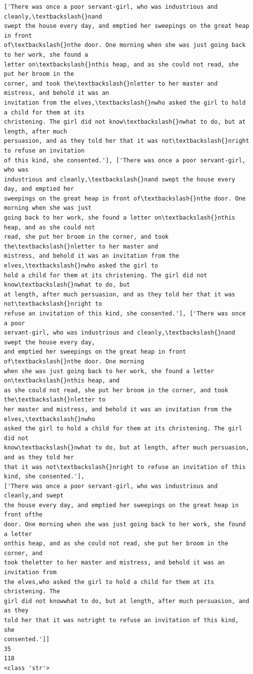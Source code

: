 \documentclass[11pt]{article}
\begin{document}
\begin{Verbatim}[commandchars=\\\{\}]
['There was once a poor servant-girl, who was industrious and cleanly,\textbackslash{}nand
swept the house every day, and emptied her sweepings on the great heap in front
of\textbackslash{}nthe door. One morning when she was just going back to her work, she found a
letter on\textbackslash{}nthis heap, and as she could not read, she put her broom in the
corner, and took the\textbackslash{}nletter to her master and mistress, and behold it was an
invitation from the elves,\textbackslash{}nwho asked the girl to hold a child for them at its
christening. The girl did not know\textbackslash{}nwhat to do, but at length, after much
persuasion, and as they told her that it was not\textbackslash{}nright to refuse an invitation
of this kind, she consented.'], ['There was once a poor servant-girl, who was
industrious and cleanly,\textbackslash{}nand swept the house every day, and emptied her
sweepings on the great heap in front of\textbackslash{}nthe door. One morning when she was just
going back to her work, she found a letter on\textbackslash{}nthis heap, and as she could not
read, she put her broom in the corner, and took the\textbackslash{}nletter to her master and
mistress, and behold it was an invitation from the elves,\textbackslash{}nwho asked the girl to
hold a child for them at its christening. The girl did not know\textbackslash{}nwhat to do, but
at length, after much persuasion, and as they told her that it was not\textbackslash{}nright to
refuse an invitation of this kind, she consented.'], ['There was once a poor
servant-girl, who was industrious and cleanly,\textbackslash{}nand swept the house every day,
and emptied her sweepings on the great heap in front of\textbackslash{}nthe door. One morning
when she was just going back to her work, she found a letter on\textbackslash{}nthis heap, and
as she could not read, she put her broom in the corner, and took the\textbackslash{}nletter to
her master and mistress, and behold it was an invitation from the elves,\textbackslash{}nwho
asked the girl to hold a child for them at its christening. The girl did not
know\textbackslash{}nwhat to do, but at length, after much persuasion, and as they told her
that it was not\textbackslash{}nright to refuse an invitation of this kind, she consented.'],
['There was once a poor servant-girl, who was industrious and cleanly,and swept
the house every day, and emptied her sweepings on the great heap in front ofthe
door. One morning when she was just going back to her work, she found a letter
onthis heap, and as she could not read, she put her broom in the corner, and
took theletter to her master and mistress, and behold it was an invitation from
the elves,who asked the girl to hold a child for them at its christening. The
girl did not knowwhat to do, but at length, after much persuasion, and as they
told her that it was notright to refuse an invitation of this kind, she
consented.']]
35
118
<class 'str'>
    \end{Verbatim}
\end{document}
